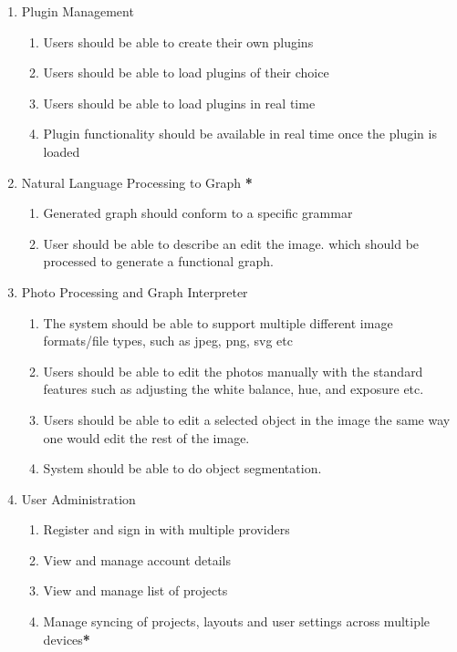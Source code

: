 \documentclass[11pt,a4paper]{article}
\begin{document}
\begin{enumerate}[label=\arabic*.]
    \item Plugin Management
    \begin{enumerate}[label*=\arabic*.]
        \item Users should be able to create their own plugins
        \item Users should be able to load plugins of their choice
        \item Users should be able to load plugins in real time
        \item Plugin functionality should be available in real time once the plugin is loaded
    \end{enumerate}
    
    \item Natural Language Processing to Graph \textbf{*}
    \begin{enumerate}[label*=\arabic*.]
        \item Generated graph should conform to a specific grammar
        \item User should be able to describe an edit the image.
        which should be processed to generate a functional graph.
    \end{enumerate}
    
    \item Photo Processing and Graph Interpreter
    \begin{enumerate}[label*=\arabic*.]
        \item The system should be able to support multiple different image formats/file
        types, such as jpeg, png, svg etc 
        \item Users should be able to edit the photos manually with the standard 
        features such as adjusting the white balance, hue, and exposure etc. 
        \item Users should be able to edit a selected object in the image the 
        same way one would edit the rest of the image. 
        \item System should be able to do object segmentation.
    \end{enumerate}

    \item User Administration
    \begin{enumerate}[label*=\arabic*.]
	\item Register and sign in with multiple providers
	\item View and manage account details
	\item View and manage list of projects
	\item Manage syncing of projects, layouts and user settings across multiple
	devices\textbf{*}
    \end{enumerate}
\end{enumerate}
\end{document}
